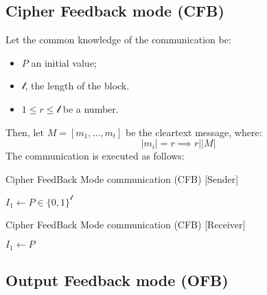 \subsection{Cipher Feedback mode (CFB)}
Let the common knowledge of the communication be:
\begin{itemize}
    \item $P$ an initial value;
    \item $\mathcal{l}$, the length of the block.
    \item $1 \leq r \leq \mathcal{l}$ be a number.
\end{itemize}
Then, let $M = [m_{1}, \dots, m_{t}]$ be the cleartext message, where:
\[|m_{i}| = r \implies r | |M| \]
The communication is executed as follows:
\begin{algorithm}
\caption{Cipher FeedBack Mode communication (CFB) [Sender]}\label{alg:CFB_sender}
$I_{1} \gets P \in \{0,1\}^{\mathcal{l}}$\;
\end{algorithm}

\begin{algorithm}
\caption{Cipher FeedBack Mode communication (CFB) [Receiver]}\label{alg:CFB_receiver}
$I_{1} \gets P $\;
\end{algorithm}

\subsection{Output Feedback mode (OFB)}

